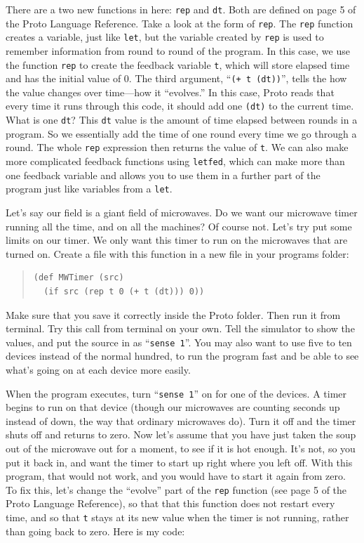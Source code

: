\documentclass{article}
\newcommand\var[1]{{\tt #1}}
\newcommand\qvar[1]{``{\tt #1}''}
\begin{document}
There are a two new functions in here: \var{rep} and \var{dt}.  Both
are defined on page 5 of the Proto Language Reference.  Take a look at
the form of \var{rep}.  The \var{rep} function creates a variable,
just like \var{let}, but the variable created by \var{rep} is used to
remember information from round to round of the program.  In this
case, we use the function \var{rep} to create the feedback variable
\var{t}, which will store elapsed time and has the initial value of 0.
The third argument, \qvar{(+ t (dt))}, tells the how the value changes
over time---how it ``evolves.''  In this case, Proto reads that every
time it runs through this code, it should add one \var{(dt)} to the
current time.  What is one \var{dt}?  This \var{dt} value is the
amount of time elapsed between rounds in a program.  So we essentially
add the time of one round every time we go through a round.  The whole
\var{rep} expression then returns the value of \var{t}.  We can also
make more complicated feedback functions using \var{letfed}, which can
make more than one feedback variable and allows you to use them in a
further part of the program just like variables from a \var{let}.

Let's say our field is a giant field of microwaves.  Do we want our
microwave timer running all the time, and on all the machines?  Of
course not.  Let's try put some limits on our timer.  We only want
this timer to run on the microwaves that are turned on.  Create a file
with this function in a new file in your programs folder:

\begin{quote}
\begin{verbatim}
(def MWTimer (src)
  (if src (rep t 0 (+ t (dt))) 0))
\end{verbatim}
\end{quote}

Make sure that you save it correctly inside the Proto folder. Then run
it from terminal.  Try this call from terminal on your own.  Tell the
simulator to show the values, and put the source in as \qvar{sense 1}.
You may also want to use five to ten devices instead of the normal
hundred, to run the program fast and be able to see what's going on at
each device more easily.

When the program executes, turn \qvar{sense 1} on for one of the
devices.  A timer begins to run on that device (though our microwaves
are counting seconds up instead of down, the way that ordinary
microwaves do).  Turn it off and the timer shuts off and returns to
zero.  Now let's assume that you have just taken the soup out of the
microwave out for a moment, to see if it is hot enough.  It's not, so
you put it back in, and want the timer to start up right where you
left off.  With this program, that would not work, and you would have
to start it again from zero.  To fix this, let's change the ``evolve''
part of the \var{rep} function (see page 5 of the Proto Language
Reference), so that that this function does not restart every time,
and so that \var{t} stays at its new value when the timer is not
running, rather than going back to zero. Here is my code:
\end{document}
